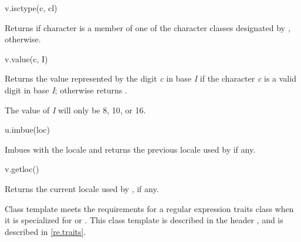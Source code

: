 \begin{itemdecl}
v.isctype(c, cl)
\end{itemdecl}

\begin{itemdescr}
\pnum
\result
{}

\pnum
\returns
Returns  if character  is a member of
one of the character classes designated by ,
 otherwise.
\end{itemdescr}

\begin{itemdecl}
v.value(c, I)
\end{itemdecl}

\begin{itemdescr}
\pnum
\result
{}

\pnum
\returns
Returns the value represented by the digit \textit{c} in base
\textit{I} if the character \textit{c} is a valid digit in base \textit{I};
otherwise returns .
\begin{note}
The value of \textit{I} will only be 8, 10, or 16.
\end{note}
\end{itemdescr}

\begin{itemdecl}
u.imbue(loc)
\end{itemdecl}

\begin{itemdescr}
\pnum
\result
{}

%
\pnum
\effects
Imbues  with the locale  and
returns the previous locale used by  if any.
\end{itemdescr}

\begin{itemdecl}
v.getloc()
\end{itemdecl}

\begin{itemdescr}
\pnum
\result
{}

\pnum
\returns
Returns the current locale used by , if any. %
\end{itemdescr}

\pnum
\begin{note}
Class template  meets the requirements for a
regular expression traits class when it is specialized for
 or .  This class template is described in
the header , and is described in \ref{re.traits}.
\end{note}

